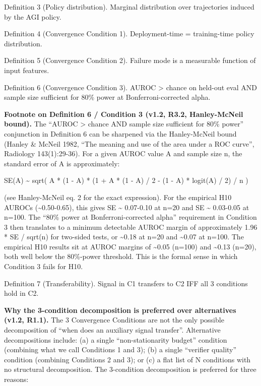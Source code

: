 \documentclass[11pt]{article}
\begin{document}
Definition 3 (Policy distribution). Marginal distribution over
trajectories induced by the AGI policy.

Definition 4 (Convergence Condition 1). Deployment-time = training-time
policy distribution.

Definition 5 (Convergence Condition 2). Failure mode is a measurable
function of input features.

Definition 6 (Convergence Condition 3). AUROC \textgreater{} chance on
held-out eval AND sample size sufficient for 80\% power at
Bonferroni-corrected alpha.

\textbf{Footnote on Definition 6 / Condition 3 (v1.2, R3.2,
Hanley-McNeil bound).} The ``AUROC \textgreater{} chance AND sample size
sufficient for 80\% power'' conjunction in Definition 6 can be sharpened
via the Hanley-McNeil bound (Hanley \& McNeil 1982, ``The meaning and
use of the area under a ROC curve'', Radiology 143(1):29-36). For a
given AUROC value A and sample size n, the standard error of A is
approximately:

SE(A) \textasciitilde{} sqrt( A * (1 - A) * (1 + A * (1 - A) / 2 - (1 -
A) * logit(A) / 2) / n )

(see Hanley-McNeil eq. 2 for the exact expression). For the empirical
H10 AUROCs (\textasciitilde0.50-0.65), this gives SE \textasciitilde{}
0.07-0.10 at n=20 and SE \textasciitilde{} 0.03-0.05 at n=100. The
``80\% power at Bonferroni-corrected alpha'' requirement in Condition 3
then translates to a minimum detectable AUROC margin of approximately
1.96 * SE / sqrt(n) for two-sided tests, or \textasciitilde0.18 at n=20
and \textasciitilde0.07 at n=100. The empirical H10 results sit at AUROC
margins of \textasciitilde0.05 (n=100) and \textasciitilde0.13 (n=20),
both well below the 80\%-power threshold. This is the formal sense in
which Condition 3 fails for H10.

Definition 7 (Transferability). Signal in C1 transfers to C2 IFF all 3
conditions hold in C2.

\textbf{Why the 3-condition decomposition is preferred over alternatives
(v1.2, R1.1).} The 3 Convergence Conditions are not the only possible
decomposition of ``when does an auxiliary signal transfer''. Alternative
decompositions include: (a) a single ``non-stationarity budget''
condition (combining what we call Conditions 1 and 3); (b) a single
``verifier quality'' condition (combining Conditions 2 and 3); or (c) a
flat list of N conditions with no structural decomposition. The
3-condition decomposition is preferred for three reasons:
\end{document}

